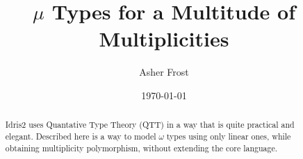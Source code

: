 \documentclass{article}
\begin{document}
\title{$\mu$ Types for a Multitude of Multiplicities}
\author{Asher Frost}
\date{\today}
\maketitle	
	
\begin{abstract}
	Idris2 uses Quantative Type Theory (QTT) in a way that is quite practical and elegant.
	Described here is a way to model $\omega$ types using only linear ones, while obtaining multiplicity polymorphism, without extending the core language.
\end{abstract}	


\printbibliography
\end{document}
